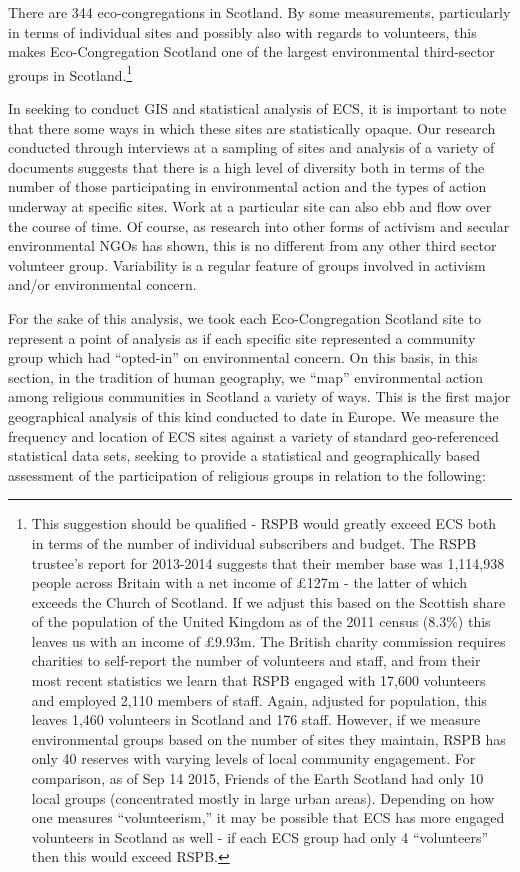 \documentclass[11pt,]{article}
\let\rmarkdownfootnote\footnote%
\def\footnote{\protect\rmarkdownfootnote}
\begin{document}
There are 344 eco-congregations in Scotland. By some measurements,
particularly in terms of individual sites and possibly also with regards
to volunteers, this makes Eco-Congregation Scotland one of the largest
environmental third-sector groups in Scotland.\footnote{This suggestion
  should be qualified - RSPB would greatly exceed ECS both in terms of
  the number of individual subscribers and budget. The RSPB trustee's
  report for 2013-2014 suggests that their member base was 1,114,938
  people across Britain with a net income of £127m - the latter of which
  exceeds the Church of Scotland. If we adjust this based on the
  Scottish share of the population of the United Kingdom as of the 2011
  census (8.3\%) this leaves us with an income of £9.93m. The British
  charity commission requires charities to self-report the number of
  volunteers and staff, and from their most recent statistics we learn
  that RSPB engaged with 17,600 volunteers and employed 2,110 members of
  staff. Again, adjusted for population, this leaves 1,460 volunteers in
  Scotland and 176 staff. However, if we measure environmental groups
  based on the number of sites they maintain, RSPB has only 40 reserves
  with varying levels of local community engagement. For comparison, as
  of Sep 14 2015, Friends of the Earth Scotland had only 10 local groups
  (concentrated mostly in large urban areas). Depending on how one
  measures ``volunteerism,'' it may be possible that ECS has more
  engaged volunteers in Scotland as well - if each ECS group had only 4
  ``volunteers'' then this would exceed RSPB.}

In seeking to conduct GIS and statistical analysis of ECS, it is
important to note that there some ways in which these sites are
statistically opaque. Our research conducted through interviews at a
sampling of sites and analysis of a variety of documents suggests that
there is a high level of diversity both in terms of the number of those
participating in environmental action and the types of action underway
at specific sites. Work at a particular site can also ebb and flow over
the course of time. Of course, as research into other forms of activism
and secular environmental NGOs has shown, this is no different from any
other third sector volunteer group. Variability is a regular feature of
groups involved in activism and/or environmental concern.

For the sake of this analysis, we took each Eco-Congregation Scotland
site to represent a point of analysis as if each specific site
represented a community group which had ``opted-in'' on environmental
concern. On this basis, in this section, in the tradition of human
geography, we ``map'' environmental action among religious communities
in Scotland a variety of ways. This is the first major geographical
analysis of this kind conducted to date in Europe. We measure the
frequency and location of ECS sites against a variety of standard
geo-referenced statistical data sets, seeking to provide a statistical
and geographically based assessment of the participation of religious
groups in relation to the following:
\end{document}
